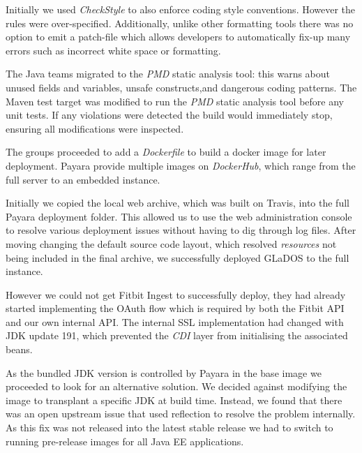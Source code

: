 \par
Initially we used \textit{CheckStyle} to also enforce coding style conventions. However the rules were over-specified. Additionally, unlike other formatting tools there was no option to emit a patch-file which allows developers to automatically fix-up many errors such as incorrect white space or formatting.

\par
The Java teams migrated to the \textit{PMD}\cite{PMD} static analysis tool: this warns about unused fields and variables, unsafe constructs,and dangerous coding patterns.
The Maven test target was modified to run the \textit{PMD}\cite{PMD} static analysis tool before any unit tests. If any violations were detected the build would immediately stop, ensuring all modifications were inspected.

\par
The groups proceeded to add a \textit{Dockerfile} to build a docker image for later deployment. Payara provide multiple images on \textit{DockerHub}\cite{DockerHub_Payara}, which range from the full server to an embedded instance.

\par
Initially we copied the local web archive, which was built on Travis, into the full Payara deployment folder. This allowed us to use the web administration console to resolve various deployment issues without having to dig through log files. After moving changing the default source code layout, which resolved \textit{resources} not being included in the final archive, we successfully deployed GLaDOS to the full instance.

\par
However we could not get Fitbit Ingest to successfully deploy, they had already started implementing the OAuth flow which is required by both the Fitbit API and our own internal API. The internal SSL implementation had changed with JDK update 191, which prevented the \textit{CDI} layer from initialising the associated beans.

\par
As the bundled JDK version is controlled by Payara in the base image we proceeded to look for an alternative solution. We decided against modifying the image to transplant a specific JDK at build time. Instead, we found that there was an open upstream issue\cite{payara_ssl_issue} that used reflection to resolve the problem internally. As this fix was not released into the latest stable release we had to switch to running pre-release images for all Java EE applications.

